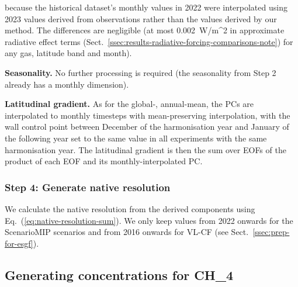 because the historical dataset's monthly values in 2022 were interpolated using
2023 values derived from observations rather than the values derived by our method.
The differences are negligible
(at most 0.002~W/m^2 in approximate radiative effect terms (Sect.~\ref{ssec:results-radiative-forcing-comparisons-note})
for any gas, latitude band and month).

\textbf{Seasonality.}
No further processing is required (the seasonality from Step 2 already has a monthly dimension).

\textbf{Latitudinal gradient.}
As for the global-, annual-mean, the PCs are interpolated to monthly timesteps with mean-preserving interpolation,
with the wall control point between December of the harmonisation year and January of the following year
set to the same value in all experiments with the same harmonisation year.
The latitudinal gradient is then the sum over EOFs of the product of each EOF and its monthly-interpolated PC.

\subsubsection{Step 4: Generate native resolution}
\label{sssec:methods-co2-generate-native-resolution}

We calculate the native resolution from the derived components using Eq.~(\ref{eq:native-resolution-sum}).
We only keep values from 2022 onwards for the ScenarioMIP scenarios and from 2016 onwards for VL-CF
(see Sect.~\ref{ssec:prep-for-esgf}).

\subsection{Generating concentrations for CH_4}
\label{ssec:methods-ch4}

